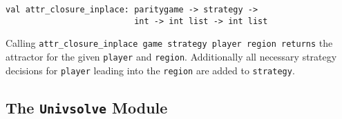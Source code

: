\begin{description}
\item
\begin{verbatim}
val attr_closure_inplace: paritygame -> strategy ->
                          int -> int list -> int list
\end{verbatim}
Calling \verb+attr_closure_inplace game strategy player region returns+ the attractor for the given \verb+player+
and \verb+region+. Additionally all necessary strategy decisions for \verb+player+ leading into the \verb+region+
are added to \verb+strategy+.

\end{description}


\subsection{The {\tt Univsolve} Module}

